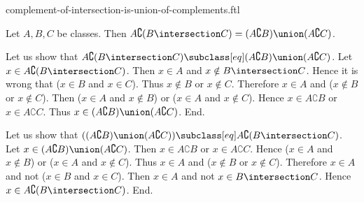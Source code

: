 \documentclass{article}
\begin{document}
\begin{smodule}[creators={Marcel Schütz}]{complement-of-intersection-is-union-of-complements.ftl}

  \begin{fproposition*}[label=2864251928576000]
    Let $A, B, C$ be classes.
    Then $A \complement (B \intersection C) = (A \complement B) \union (A \complement C)$.
  \end{fproposition*}
  \begin{fproof}
    Let us show that $A \complement (B \intersection C) \subclass[eq]
    (A \complement B) \union (A \complement C)$.
      Let $x \in A \complement (B \intersection C)$.
      Then $x \in A$ and $x \notin B \intersection C$.
      Hence it is wrong that ($x \in B$ and $x \in C$).
      Thus $x \notin B$ or $x \notin C$.
      Therefore $x \in A$ and ($x \notin B$ or $x \notin C$).
      Then ($x \in A$ and $x \notin B$) or ($x \in A$ and $x \notin C$).
      Hence $x \in A \complement B$ or $x \in A \complement C$.
      Thus $x \in (A \complement B) \union (A \complement C)$.
    End.

    Let us show that $((A \complement B) \union (A \complement C)) \subclass[eq]
    A \complement (B \intersection C)$. %
      Let $x \in (A \complement B) \union (A \complement C)$.
      Then $x \in A \complement B$ or $x \in A \complement C$.
      Hence ($x \in A$ and $x \notin B$) or ($x \in A$ and $x \notin C$).
      Thus $x \in A$ and ($x \notin B$ or $x \notin C$).
      Therefore $x \in A$ and not ($x \in B$ and $x \in C$).
      Then $x \in A$ and not $x \in B \intersection C$.
      Hence $x \in A \complement (B \intersection C)$.
    End.
  \end{fproof}
\end{smodule}
\end{document}
